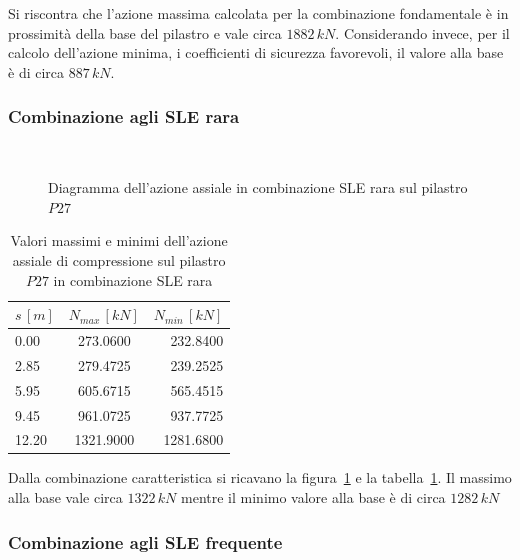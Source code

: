 Si riscontra che l'azione massima calcolata per la combinazione fondamentale è in prossimità della base del pilastro e vale circa $1882\,kN$. Considerando invece, per il calcolo dell'azione minima, i coefficienti di sicurezza favorevoli, il valore alla base è di circa $887\,kN$.

\subsubsection{Combinazione agli SLE rara}

\begin{figure}
	\centering
	\\
	\caption{Diagramma dell'azione assiale in combinazione SLE rara sul pilastro $P27$}
	\label{fig:P27_axialLoad_sleRara}
\end{figure}

\begin{table}
	\centering
	\caption{Valori massimi e minimi dell'azione assiale di compressione sul pilastro $P27$ in combinazione SLE rara}
	\label{tab:P27_axialLoad_sleRara}
	\begin{tabular*}{\textwidth}{l @{\extracolsep{\fill}} cr}
		\toprule
		$s\,[m]$ & $N_{max}\,[kN]$ & $N_{min}\,[kN]$ \\
		\midrule
		0.00 &   273.0600 &   232.8400 \\
		2.85 &   279.4725 &   239.2525 \\
		5.95 &   605.6715 &   565.4515 \\
		9.45 &   961.0725 &   937.7725 \\
		12.20 &  1321.9000 &  1281.6800 \\
		\bottomrule
	\end{tabular*}
\end{table}

Dalla combinazione caratteristica si ricavano la figura~\ref{fig:P27_axialLoad_sleRara} e la tabella~\ref{tab:P27_axialLoad_sleRara}. Il massimo alla base vale circa $1322\,kN$ mentre il minimo valore alla base è di circa $1282\,kN$

\subsubsection{Combinazione agli SLE frequente}

